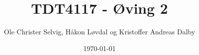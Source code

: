 \documentclass[]{article}
\begin{document}
\title{TDT4117 - Øving 2}
\author{Ole Christer Selvig, Håkon Løvdal og Kristoffer Andreas Dalby}
\date{\today}
\maketitle

\pagebreak






\end{document}
